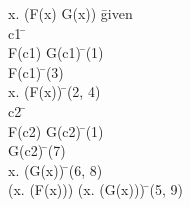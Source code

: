 \documentclass{article}
\begin{document}
\begin{proofbox}
\: \forall x. (F(x) \land G(x)) \= \hbox{given} \\
\open
\: c1 \= \forallintroconst \\
\: F(c1) \land G(c1) \= \forallelim(1) \\
\: F(c1) \= \andelim(3) \\
\close
\: \forall x. (F(x)) \= \forallintro(2, 4) \\
\open
\: c2 \= \forallintroconst \\
\: F(c2) \land G(c2) \= \forallelim(1) \\
\: G(c2) \= \andelim(7) \\
\close
\: \forall x. (G(x)) \= \forallintro(6, 8) \\
\: (\forall x. (F(x))) \land (\forall x. (G(x))) \= \andintro(5, 9) \\
\end{proofbox}
\end{document}
